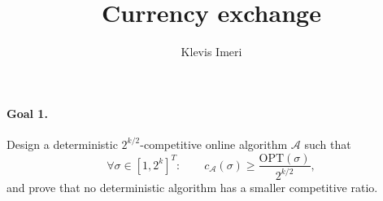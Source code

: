 \documentclass[12pt,a4paper]{article}
\title{Currency exchange}
\author{Klevis Imeri}
\date{}
\begin{document}
\maketitle

\paragraph{Goal 1.}
Design a deterministic $2^{k/2}$-competitive online algorithm $\mathcal A$
such that
\[
\forall\sigma\in[1,2^k]^T:\qquad
c_{\mathcal A}(\sigma)
\geq\frac{\mathrm{OPT}(\sigma)}{2^{k/2}},
\]
and prove that no deterministic algorithm has a smaller competitive ratio.
\end{document}
